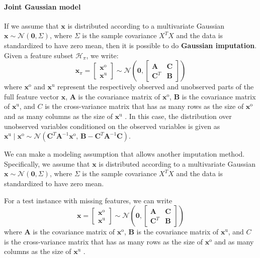 \paragraph{Joint Gaussian model}

If we assume that $\mathbf{x}$ is distributed according to a multivariate Gaussian $\mathbf{x} \sim \mathcal{N}(\mathbf{0}, \Sigma)$, where $\Sigma$ is the sample covariance $X^T X$ and the data is standardized to have zero mean, then it is possible to do \textbf{Gaussian imputation}.
Given a feature subset $\mathcal{H}_\pi$, we write:
\begin{equation}
\mathbf{x}_\pi = \begin{bmatrix} \mathbf{x}^\text{o}\\  \mathbf{x}^\text{u} \end{bmatrix} \sim \mathcal{N} \left( \mathbf{0}, \begin{bmatrix} \mathbf{A} & \mathbf{C}\\ \mathbf{C}^T & \mathbf{B} \end{bmatrix} \right)
\end{equation}
where $\mathbf{x}^\text{o}$ and $\mathbf{x}^\text{u}$ represent the respectively observed and unobserved parts of the full feature vector $\mathbf{x}$, $\mathbf{A}$ is the covariance matrix of $\mathbf{x}^\text{o}$, $\mathbf{B}$ is the covariance matrix of $\mathbf{x}^\text{u}$, and $C$ is the cross-variance matrix that has as many rows as the size of $\mathbf{x}^\text{o}$ and as many columns as the size of $\mathbf{x}^\text{u}$ \parencite{Roweis-gaussian-identities}.
In this case, the distribution over unobserved variables conditioned on the observed variables is given as
$\mathbf{x}^\text{u} \mid \mathbf{x}^\text{o} \sim \mathcal{N} \left( \mathbf{C}^T \mathbf{A}^{-1} \mathbf{x}^\text{o},\, \mathbf{B} - \mathbf{C}^T \mathbf{A}^{-1} \mathbf{C} \right)$.

We can make a modeling assumption that allows another imputation method.
Specifically, we assume that $\mathbf{x}$ is distributed according to a multivariate Gaussian $\mathbf{x} \sim \mathcal{N}(\mathbf{0}, \Sigma)$, where $\Sigma$ is the sample covariance $X^T X$ and the data is standardized to have zero mean.

For a test instance with missing features, we can write
\begin{equation}
\mathbf{x} = \begin{bmatrix} \mathbf{x}^\text{o}\\  \mathbf{x}^\text{u} \end{bmatrix} \sim \mathcal{N} \left( \mathbf{0}, \begin{bmatrix} \mathbf{A} & \mathbf{C}\\ \mathbf{C}^T & \mathbf{B} \end{bmatrix} \right)
\end{equation}
where $\mathbf{A}$ is the covariance matrix of $\mathbf{x}^\text{o}$, $\mathbf{B}$ is the covariance matrix of $\mathbf{x}^\text{u}$, and $C$ is the cross-variance matrix that has as many rows as the size of $\mathbf{x}^\text{o}$ and as many columns as the size of $\mathbf{x}^\text{u}$ \cite{Roweis-gaussian-identities}.

